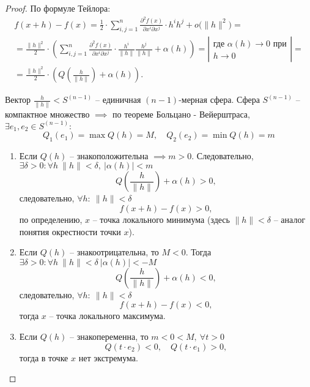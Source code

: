 \begin{proof}
    По формуле Тейлора:
    \begin{multline*}
        f(x+h) - f(x) = \frac{1}{2}\cdot \sum_{i,j=1}^{n}\frac{\partial^2f(x)}{\partial x^i \partial x^j}\cdot h^ih^j + o\big(\|h\|^2\big) = \\
        = \frac{\|h\|^2}{2}\cdot\left(\sum_{i,j=1}^{n}\frac{\partial^2f(x)}{\partial x^i\partial x^j}\cdot \frac{h^i}{\|h\|}\frac{h^j}{\|h\|} + \alpha(h)\right) = \left|\begin{array}{c}
            \text{где }\alpha(h)\rightarrow 0\text{ при} \\
            h \rightarrow 0
        \end{array}\right| = \\
        = \frac{\|h\|^2}{2}\cdot\left(Q\left(\frac{h}{\|h\|}\right) + \alpha(h)\right).
    \end{multline*}

    Вектор $\frac{h}{\|h\|} < S^{(n-1)}$ -- единичная $(n-1)$-мерная сфера. Сфера $S^{(n-1)}$ -- компактное множество $\implies$ по теореме Больцано - Вейерштраса, $\exists e_1,e_2 \in S^{(n-1)}:$
    \[
        Q_1(e_1) = \max Q(h) = M, \quad Q_2(e_2) = \min Q(h) = m
    \]

    \begin{enumerate}
        \item Если $Q(h)$ -- знакоположительна $\implies m > 0$. Следовательно, $ \exists \delta > 0: \forall h \ \|h\| < \delta, \ |\alpha(h)| < m $
              \[
                  Q\left(\frac{h}{\|h\|}\right) + \alpha(h) > 0,
              \] следовательно, $ \forall h: \ \|h\| < \delta $
              \[
                  f(x+h) - f(x) > 0,
              \] по определению, $x$ -- точка локального минимума (здесь $\|h\| < \delta$ -- аналог понятия окрестности точки $x$).
        \item Если $Q(h)$ -- знакоотрицательна, то $M < 0$. Тогда $ \exists \delta > 0: \forall h \ \|h\| < \delta \ |\alpha(h)| < -M$
              \[
                  Q\left(\frac{h}{\|h\|}\right) + \alpha(h) < 0,
              \] следовательно, $ \forall h: \ \|h\| < \delta $
              \[
                  f(x+h) - f(x) < 0,
              \] тогда $ x $ -- точка локального максимума.
        \item Если $Q(h)$ -- знакопеременна, то $m < 0 < M, \ \forall t > 0$
              \[
                  Q(t\cdot e_2) < 0, \quad Q(t \cdot e_1) > 0,
              \] тогда в точке $x$ нет экстремума.
    \end{enumerate}
\end{proof}

